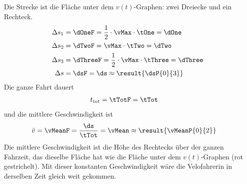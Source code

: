 \begin{abcliste}
\abc Die Strecke ist die Fläche unter dem $v(t)$-Graphen: zwei Dreiecke und ein Rechteck.
\begin{align}
 \Delta s_1 &= \dOneF = \frac{1}{2}\cdot\vMax\cdot\tOne = \dOne \\
 \Delta s_2 &= \dTwoF = \vMax\cdot\tTwo = \dTwo \\
 \Delta s_3 &= \dThreeF = \frac{1}{2}\cdot\vMax\cdot\tThree = \dThree \\
 \Delta s &= \dsF = \ds \approx \result{\dsP{0}{3}}
\end{align}
\abc Die ganze Fahrt dauert
\begin{align}
 t_\mathrm{tot} &= \tTotF = \tTot
\end{align}
und die mittlere Geschwindigkeit ist
\begin{align}
 \bar v &= \vMeanF = \frac{\ds}{\tTot} = \vMean \approx \result{\vMeanP{0}{2}}
\end{align}
\abc Die mittlere Geschwindigkeit ist die Höhe des Rechtecks über der ganzen Fahrzeit, das dieselbe Fläche hat wie die Fläche unter dem $v(t)$-Graphen (rot gestrichelt). Mit dieser konstanten Geschwindigkeit wäre die Velofahrerin in derselben Zeit gleich weit gekommen.
\begin{center}
\end{center}
\end{abcliste}
